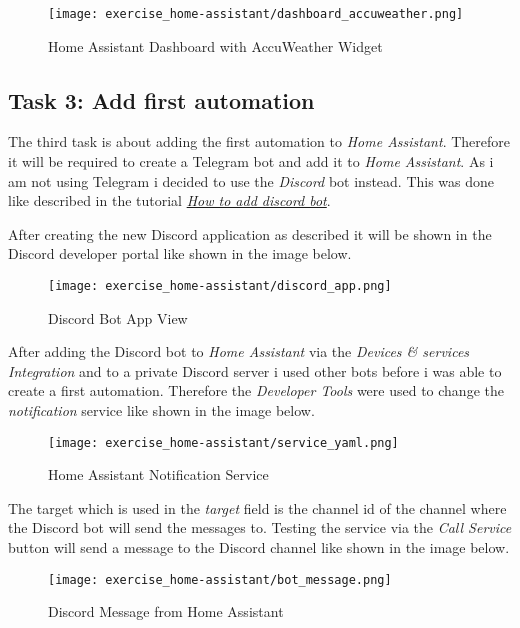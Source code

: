 \begin{figure}[H]
    \centering
    \texttt{[image: exercise\_home-assistant/dashboard\_accuweather.png]}
    \caption{Home Assistant Dashboard with AccuWeather Widget}
    \label{fig:home_assistant_dashboard_accuweather}
\end{figure}

\subsection{Task 3: Add first automation}
The third task is about adding the first automation to \textit{Home Assistant}.
Therefore it will be required to create a Telegram bot and add it to \textit{Home Assistant}. As i am not using 
Telegram i decided to use the \textit{Discord} bot instead. This was done like described in the tutorial 
\href{https://www.home-assistant.io/integrations/discord}{\textit{How to add discord bot}}.

After creating the new Discord application as described it will be shown in the Discord developer portal like 
shown in the image below.

\begin{figure}[H]
    \centering
    \texttt{[image: exercise\_home-assistant/discord\_app.png]}
    \caption{Discord Bot App View}
    \label{fig:discord_bot}
\end{figure}

After adding the Discord bot to \textit{Home Assistant} via the \textit{Devices & services Integration} and to a 
private Discord server i used other bots before i was able to create a first automation.
Therefore the \textit{Developer Tools} were used to change the \textit{notification} service like shown in the 
image below.

\begin{figure}[H]
    \centering
    \texttt{[image: exercise\_home-assistant/service\_yaml.png]}
    \caption{Home Assistant Notification Service}
    \label{fig:home_assistant_notification_service}
\end{figure}

The target which is used in the \textit{target} field is the channel id of the channel where the Discord bot will 
send the messages to. Testing the service via the \textit{Call Service} button will send a message to the Discord 
channel like shown in the image below.

\begin{figure}[H]
    \centering
    \texttt{[image: exercise\_home-assistant/bot\_message.png]}
    \caption{Discord Message from Home Assistant}
    \label{fig:discord_message}
\end{figure}


